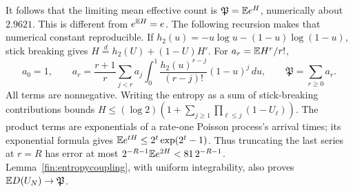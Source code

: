 It follows that the limiting mean effective count is
$\mathfrak P=\mathbb E e^H$, numerically about $2.9621$.
This is different from $e^{\mathbb E H}=e$.
The following recursion makes that numerical constant reproducible.
If $h_2(u)=-u\log u-(1-u)\log(1-u)$, stick breaking gives
$H\overset d=h_2(U)+(1-U)H'$.
For $a_r=\mathbb E H^r/r!$,
\[
 a_0=1,\qquad
 a_r=\frac{r+1}{r}\sum_{j<r}a_j
       \int_0^1\frac{h_2(u)^{r-j}}{(r-j)!}(1-u)^j\,du,\qquad
 \mathfrak P=\sum_{r\ge0}a_r.
\]
All terms are nonnegative.  Writing the entropy as a sum of
stick-breaking contributions bounds
$H\le(\log2)(1+\sum_{j\ge1}\prod_{\ell\le j}(1-U_\ell))$.
The product terms are exponentials of a rate-one Poisson process's
arrival times; its exponential formula gives
$\mathbb E e^{tH}\le2^t\exp(2^t-1)$.
Thus truncating the last series at $r=R$ has error at most
$2^{-R-1}\mathbb E e^{2H}<81\,2^{-R-1}$.
Lemma~\ref{fin:entropycoupling}, with uniform integrability, also proves
$\mathbb E D(U_N)\to\mathfrak P$.


